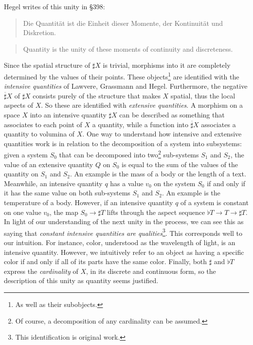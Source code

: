 \documentclass{article}
\begin{document}
Hegel writes of this unity in §398:

\begin{quote}
    Die Quantität ist die Einheit dieser Momente, der Kontinuität und Diskretion.
\end{quote}

\begin{quote}
    Quantity is the unity of these moments of continuity and discreteness.
\end{quote}

Since the spatial structure of $\sharp X$ is trivial, morphisms into it are completely determined by the
values of their points. These objects\footnote{As well as their subobjects.} are identified with the \emph{intensive
quantities} of Lawvere\cite{Law82}, Grassmann\cite{Grass} and Hegel. Furthermore, the negative $\overline{\sharp}
X$ of $\sharp X$ consists purely of the structure that makes $X$ spatial, thus the local aspects of $X$.
So these are identified with \emph{extensive quantities}. A morphism on a space $X$ into an intensive
quantity $\sharp X$ can be described as something that associates to each point of $X$ a quantity, while
a function into $\overline{\sharp} X$ associates a quantity to volumina of $X$. One way to understand
how intensive and extensive quantities work is in relation to the decomposition of a system into subsystems\cite{nlabie}:
given a system $S_0$ that can be decomposed into two\footnote{Of course, a decomposition of any cardinality
can be assumed.} sub-systems $S_1$ and $S_2$, the value of an extensive quantity $Q$ on $S_0$ is equal
to the sum of the values of the quantity on $S_1$ and $S_2$. An example is the mass of a body or the length
of a text. Meanwhile, an intensive quantity $q$ has a value $v_0$ on the system $S_0$ if and only if it
has the same value on both sub-systems $S_1$ and $S_2$. An example is the temperature of a body. However,
if an intensive quantity $q$ of a system is constant on one value $v_0$, the map $S_0\rightarrow\sharp
T$ lifts through the aspect sequence $\flat T\rightarrow T\rightarrow\sharp T$. In light of our understanding
of the next unity in the process, we can see this as saying that \emph{constant intensive quantities are
qualities}\footnote{This identification is original work.}. This corresponds well to our intuition. For
instance, color, understood as the wavelength of light, is an intensive quantity. However, we intuitively
refer to an object as having a specific color if and only if all of its parts have the same color. Finally,
both $\sharp$ and $\flat T$ express the \emph{cardinality} of $X$, in its discrete and continuous form,
so the description of this unity as quantity seems justified. \\
\end{document}
